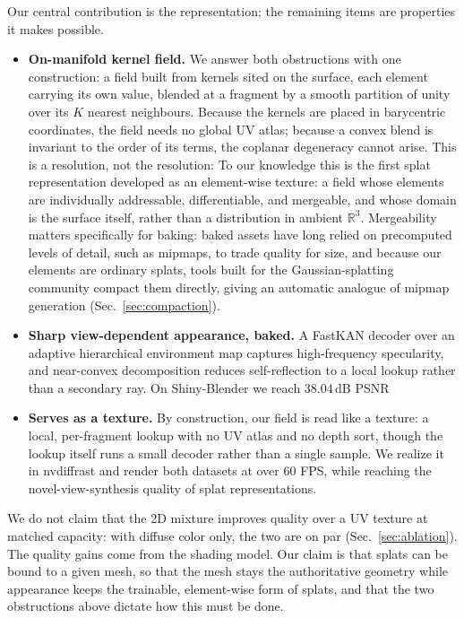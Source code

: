 Our central contribution is the representation; the remaining items are properties it makes
possible.
\begin{itemize}
\item \textbf{On-manifold kernel field.} We answer both obstructions with one construction: a
field built from kernels sited on the surface, each element carrying its own value, blended at a
fragment by a smooth partition of unity over its $K$ nearest neighbours. Because the kernels are
placed in barycentric coordinates, the field needs no global UV atlas; because a convex blend is
invariant to the order of its terms, the coplanar degeneracy cannot arise. This is a resolution, not
the resolution: 
To our knowledge this is the first splat representation developed as an element-wise texture:
a field whose elements are individually addressable, differentiable, and mergeable, and whose
domain is the surface itself, rather than a distribution in ambient $\mathbb{R}^3$. Mergeability
matters specifically for baking: baked assets have long relied on precomputed levels of detail,
such as mipmaps, to trade quality for size, and because our elements are ordinary splats, tools
built for the Gaussian-splatting community compact them directly, giving an automatic analogue of
mipmap generation (Sec.~\ref{sec:compaction}).

\item \textbf{Sharp view-dependent appearance, baked.} A FastKAN decoder over an adaptive
hierarchical environment map captures high-frequency specularity, and near-convex decomposition
reduces self-reflection to a local lookup rather than a secondary ray. On Shiny-Blender we reach
$38.04$\,dB PSNR 

\item \textbf{Serves as a texture.} By construction, our field is read like a texture: a local,
per-fragment lookup with no UV atlas and no depth sort, though the lookup itself runs a small
decoder rather than a single sample. We realize it in nvdiffrast and render both datasets at over
$60$ FPS, while reaching the novel-view-synthesis quality of splat representations.
\end{itemize}
\begin{addblock}
We do not claim that the 2D mixture improves quality over a UV texture at matched capacity: with
diffuse color only, the two are on par (Sec.~\ref{sec:ablation}). The quality gains come from the
shading model. Our claim is that splats can be bound to a given mesh, so that the mesh stays the
authoritative geometry while appearance keeps the trainable, element-wise form of splats, and that
the two obstructions above dictate how this must be done.
\end{addblock}
